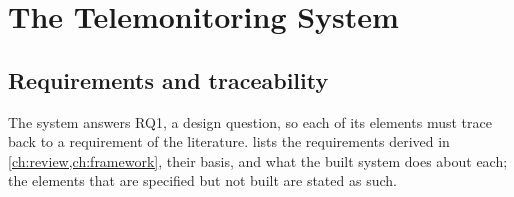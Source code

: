 \documentclass[11pt,a4paper,oneside]{report}
\begin{document}
\section{The Telemonitoring System}\label{sec:system}\label{sec:backend}\label{sec:interfaces}

\subsection{Requirements and traceability}\label{sec:design-req}\label{sec:traceability}

The system answers RQ1, a design question, so each of its elements must trace back to a requirement of the literature.  lists the requirements derived in \cref{ch:review,ch:framework}, their basis, and what the built system does about each; the elements that are specified but not built are stated as such.
\end{document}
